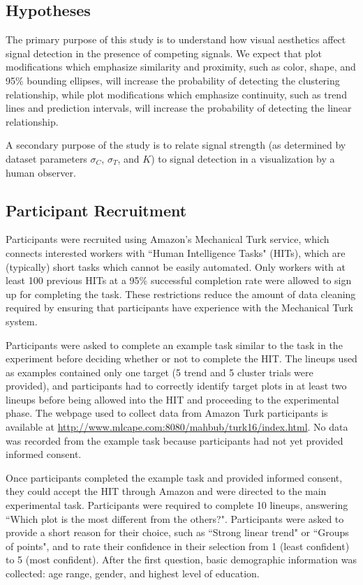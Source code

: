 \documentclass[11pt]{isuthesis}\usepackage[]{graphicx}\usepackage[]{color}
\begin{document}
\subsection{Hypotheses}
The primary purpose of this study is to understand how visual aesthetics affect signal detection in the presence of competing signals. We expect that plot modifications which emphasize similarity and proximity, such as color, shape, and 95\% bounding ellipses, will increase the probability of detecting the clustering relationship, while plot modifications which emphasize continuity, such as trend lines and prediction intervals, will increase the probability of detecting the linear relationship. 

A secondary purpose of the study is to relate signal strength (as determined by dataset parameters $\sigma_C$, $\sigma_T$, and $K$) to signal detection in a visualization by a human observer.

\subsection{Participant Recruitment}
Participants were recruited using Amazon's Mechanical Turk service\citep{amazon}, which connects interested workers with ``Human Intelligence Tasks" (HITs), which are (typically) short tasks which cannot be easily automated. Only workers with at least 100 previous HITs at a 95\% successful completion rate were allowed to sign up for completing the task. These restrictions reduce the amount of data cleaning required by ensuring that participants have experience with the Mechanical Turk system. 

Participants were asked to complete an example task similar to the task in the experiment before deciding whether or not to complete the HIT. The lineups used as examples contained only one target (5 trend and 5 cluster trials were provided), and participants had to correctly identify target plots in at least two lineups before being allowed into  the HIT and proceeding to the experimental phase. The webpage used to collect data from Amazon Turk participants is available at \url{http://www.mlcape.com:8080/mahbub/turk16/index.html}. No data was recorded from the example task because participants had not yet provided informed consent. 

Once participants completed the example task and provided informed consent, they could accept the HIT through Amazon and were directed to the main experimental task. 
Participants were required to complete 10 lineups, answering ``Which plot is the most different from the others?". Participants were asked to provide a short reason for their choice, such as ``Strong linear trend" or ``Groups of points", and to rate their confidence in their selection from 1 (least confident) to 5 (most confident). 
After the first question, basic demographic information was collected: age range, gender, and highest level of education. 
\end{document}

